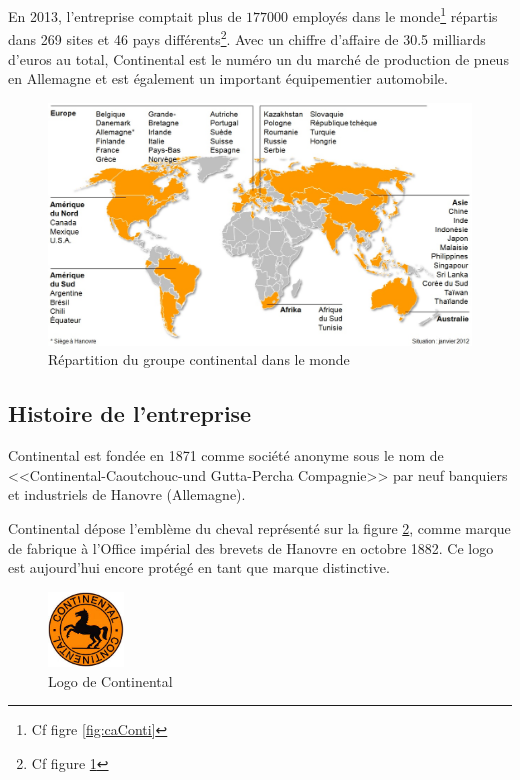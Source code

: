		 En 2013, l'entreprise comptait plus de $177000$ employés dans le monde\footnote{Cf figre \ref{fig:caConti}} répartis dans 269 sites et 46 pays différents\footnote{Cf figure \ref{fig:repartitionConti}}. Avec un chiffre d'affaire de 30.5 milliards d'euros au total, Continental est le numéro un du marché de production de pneus en Allemagne et est également un important équipementier automobile.
		 \begin{figure}[H]
		 	\centering
		 	\includegraphics[width=13cm]{contents/images/repartitionConti.jpg}
		 	\caption{Répartition du groupe continental dans le monde}
		 	\label{fig:repartitionConti}
		 \end{figure}		 

		\subsection{Histoire de l'entreprise}
		Continental est fondée en 1871 comme société anonyme sous le nom de <<Continental-Caoutchouc-und Gutta-Percha Compagnie>> par neuf banquiers et industriels de Hanovre (Allemagne).

		Continental dépose l'emblème du cheval représenté sur la figure \ref{fig:logo}, comme marque de fabrique à l'Office impérial des brevets de Hanovre en octobre 1882. Ce logo est aujourd'hui encore protégé en tant que marque distinctive.
		\begin{figure}[H]
			\centering
			\includegraphics[width=2cm]{contents/images/logo.jpg}
			\caption{Logo de Continental}
			\label{fig:logo}
		\end{figure}

